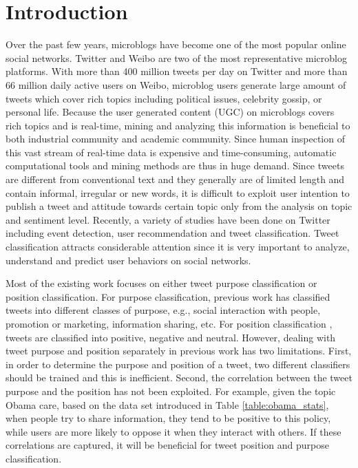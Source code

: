 \documentclass[letterpaper]{article}
\begin{document}
\section{Introduction}
\label{sec:intro}
Over the past few years, microblogs have become one of the most popular online social networks. Twitter and Weibo are two of the most representative microblog platforms. With more than 400 million tweets per day on Twitter and more than 66 million daily active users on Weibo, microblog users generate large amount of tweets which cover rich topics including political issues, celebrity gossip, or personal life. Because the user generated content (UGC) on microblogs covers rich topics and is real-time, mining and analyzing this information is beneficial to both industrial community and academic community. Since human inspection of this vast stream of real-time data is expensive and time-consuming, automatic computational tools and mining methods are thus in huge demand. Since tweets are different from conventional text and they generally are of limited length and contain informal, irregular or new words, it is difficult to exploit user intention to publish a tweet and attitude towards certain topic only from the analysis on topic and sentiment level. Recently, a variety of studies have been done on Twitter including event detection, user recommendation and tweet classification. Tweet classification attracts considerable attention since it is very important to analyze, understand and predict user behaviors on social networks.

Most of the existing work focuses on either tweet purpose classification or position classification. For purpose classification, previous work \cite{naaman2010really,alhadi2011exploring} has classified tweets into different classes of purpose, e.g., social interaction with people, promotion or marketing, information sharing, etc. For position classification \cite{saif2012alleviating,go2009twitter,kouloumpis2011twitter}, tweets are classified into positive, negative and neutral. However, dealing with tweet purpose and position separately in previous work has two limitations. First, in order to determine the purpose and position of a tweet, two different classifiers should be trained and this is inefficient. Second, the correlation between the tweet purpose and the position has not been exploited. For example, given the topic Obama care, based on the data set introduced in Table \ref{table:obama_stats}, when people try to share information, they tend to be positive to this policy, while users are more likely to oppose it when they interact with others. If these correlations are captured, it will be beneficial for tweet position and purpose classification.
\end{document}
